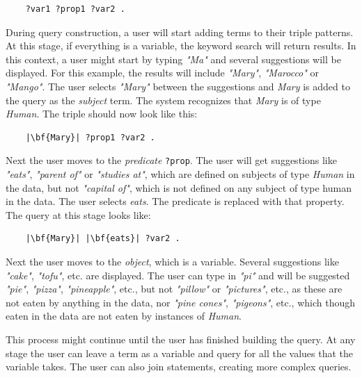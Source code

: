 \begin{verbatim}
    ?var1 ?prop1 ?var2 .
\end{verbatim}

During query construction, a user will start adding terms to their triple patterns. 
At this stage, if everything is a variable, the keyword search will return results. 
In this context, a user might start by typing \textit{"Ma"} and several suggestions will be displayed. 
For this example, the results will include \textit{"Mary"}, \textit{"Marocco"} or \textit{"Mango"}. 
The user selects \textit{"Mary"} between the suggestions and \textit{Mary} is added to the query as the \textit{subject} term. 
The system recognizes that \textit{Mary} is of type \textit{Human}. The triple should now look like this:

\begin{verbatim}
    |\bf{Mary}| ?prop1 ?var2 .
\end{verbatim}

Next the user moves to the \textit{predicate} \texttt{?prop}. 
The user will get suggestions like \textit{"eats"}, \textit{"parent of"} or \textit{"studies at"}, which are defined on subjects of type \textit{Human} in the data, but not \textit{"capital of"}, which is not defined on any subject of type human in the data. 
The user selects \textit{eats}. The predicate is replaced with that property. 
The query at this stage looks like:

\begin{verbatim}
    |\bf{Mary}| |\bf{eats}| ?var2 .
\end{verbatim}

Next the user moves to the \textit{object}, which is a variable. 
Several suggestions like \textit{"cake"}, \textit{"tofu"}, etc. are displayed. 
The user can type in \textit{"pi"} and will be suggested \textit{"pie"}, \textit{"pizza"}, \textit{"pineapple"}, etc., but not \textit{"pillow"} or \textit{"pictures"}, etc., as these are not eaten by anything in the data, nor \textit{"pine cones"}, \textit{"pigeons"}, etc., which though eaten in the data are not eaten by instances of \textit{Human}.

This process might continue until the user has finished building the query. 
At any stage the user can leave a term as a variable and query for all the values that the variable takes.
The user can also join statements, creating more complex queries.

